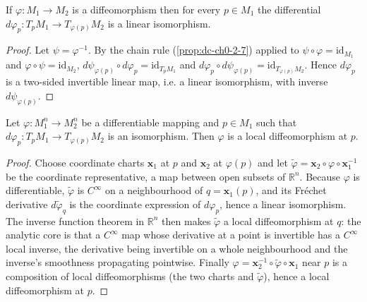 \begin{lemma}
  \label{lem:dc-ch0-2-9-iso}


  If $\varphi:M_1\to M_2$ is a diffeomorphism then for every $p\in M_1$ the
  differential $d\varphi_p:T_pM_1\to T_{\varphi(p)}M_2$ is a linear isomorphism.
\end{lemma}
\begin{proof}
  \sketch

  Let $\psi=\varphi^{-1}$. By the chain rule (\cref{prop:dc-ch0-2-7}) applied to
  $\psi\circ\varphi=\mathrm{id}_{M_1}$ and $\varphi\circ\psi=\mathrm{id}_{M_2}$,
  $d\psi_{\varphi(p)}\circ d\varphi_p=\mathrm{id}_{T_pM_1}$ and
  $d\varphi_p\circ d\psi_{\varphi(p)}=\mathrm{id}_{T_{\varphi(p)}M_2}$. Hence
  $d\varphi_p$ is a two-sided invertible linear map, i.e. a linear isomorphism, with
  inverse $d\psi_{\varphi(p)}$.
\end{proof}

\begin{theorem}
  \label{thm:dc-ch0-2-10}


  Let $\varphi:M_1^n\to M_2^n$ be a differentiable mapping and $p\in M_1$ such that
  $d\varphi_p:T_pM_1\to T_{\varphi(p)}M_2$ is an isomorphism. Then $\varphi$ is a
  local diffeomorphism at $p$.
\end{theorem}
\begin{proof}
  \sketch

  Choose coordinate charts $\mathbf{x}_1$ at $p$ and $\mathbf{x}_2$ at $\varphi(p)$
  and let $\tilde\varphi=\mathbf{x}_2\circ\varphi\circ\mathbf{x}_1^{-1}$ be the
  coordinate representative, a map between open subsets of $\mathbb{R}^n$. Because
  $\varphi$ is differentiable, $\tilde\varphi$ is $C^\infty$ on a neighbourhood of
  $q=\mathbf{x}_1(p)$, and its Fréchet derivative $d\tilde\varphi_q$ is the coordinate
  expression of $d\varphi_p$, hence a linear isomorphism. The inverse function theorem
  in $\mathbb{R}^n$ then makes $\tilde\varphi$ a local diffeomorphism at $q$: the
  analytic core is that a $C^\infty$ map whose derivative at a point is invertible has
  a $C^\infty$ local inverse, the derivative being invertible on a whole neighbourhood
  and the inverse's smoothness propagating pointwise. Finally $\varphi=\mathbf{x}_2^{-1}
  \circ\tilde\varphi\circ\mathbf{x}_1$ near $p$ is a composition of local
  diffeomorphisms (the two charts and $\tilde\varphi$), hence a local diffeomorphism
  at $p$.
\end{proof}

